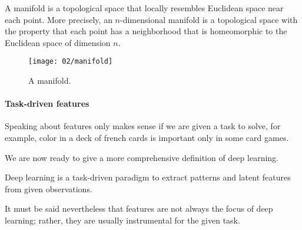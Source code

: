 \begin{defn}[Manifold]
	A manifold is a topological space that locally resembles Euclidean space near each point. More precisely, an $n$-dimensional manifold is a topological space with the property that each point has a neighborhood that is homeomorphic to the Euclidean space of dimension $n$.
\end{defn}

\begin{figure}[H]
 	\centering
 	\texttt{[image: 02/manifold]}
 	\caption{A manifold.}\label{fig:manifold}	
 \end{figure} 

\paragraph{Task-driven features}
Speaking about features only makes sense if we are given a task to solve, for example, color in a deck of french cards is important only in some card games.

We are now ready to give a more comprehensive definition of deep learning.

\begin{defn}
	Deep learning is a task-driven paradigm to extract patterns and latent features from given observations.
\end{defn}

It must be said nevertheless that features are not always the focus of deep learning; rather, they are usually instrumental for the given task.
